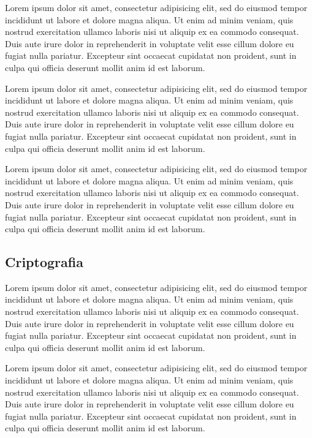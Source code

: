 \documentclass[
	12pt,				%
	twoside,			%
	a4paper,			%
	chapter=TITLE,		%
	english,			%
	brazil				%
	]{tcc}
\begin{document}
	Lorem ipsum dolor sit amet, consectetur adipisicing elit, sed do eiusmod
	tempor incididunt ut labore et dolore magna aliqua. Ut enim ad minim veniam,
	quis nostrud exercitation ullamco laboris nisi ut aliquip ex ea commodo
	consequat. Duis aute irure dolor in reprehenderit in voluptate velit esse
	cillum dolore eu fugiat nulla pariatur. Excepteur sint occaecat cupidatat non
	proident, sunt in culpa qui officia deserunt mollit anim id est laborum.

	Lorem ipsum dolor sit amet, consectetur adipisicing elit, sed do eiusmod
	tempor incididunt ut labore et dolore magna aliqua. Ut enim ad minim veniam,
	quis nostrud exercitation ullamco laboris nisi ut aliquip ex ea commodo
	consequat. Duis aute irure dolor in reprehenderit in voluptate velit esse
	cillum dolore eu fugiat nulla pariatur. Excepteur sint occaecat cupidatat non
	proident, sunt in culpa qui officia deserunt mollit anim id est laborum.

	Lorem ipsum dolor sit amet, consectetur adipisicing elit, sed do eiusmod
	tempor incididunt ut labore et dolore magna aliqua. Ut enim ad minim veniam,
	quis nostrud exercitation ullamco laboris nisi ut aliquip ex ea commodo
	consequat. Duis aute irure dolor in reprehenderit in voluptate velit esse
	cillum dolore eu fugiat nulla pariatur. Excepteur sint occaecat cupidatat non
	proident, sunt in culpa qui officia deserunt mollit anim id est laborum.

	\subsection{Criptografia}

	Lorem ipsum dolor sit amet, consectetur adipisicing elit, sed do eiusmod
	tempor incididunt ut labore et dolore magna aliqua. Ut enim ad minim veniam,
	quis nostrud exercitation ullamco laboris nisi ut aliquip ex ea commodo
	consequat. Duis aute irure dolor in reprehenderit in voluptate velit esse
	cillum dolore eu fugiat nulla pariatur. Excepteur sint occaecat cupidatat non
	proident, sunt in culpa qui officia deserunt mollit anim id est laborum.

	Lorem ipsum dolor sit amet, consectetur adipisicing elit, sed do eiusmod
	tempor incididunt ut labore et dolore magna aliqua. Ut enim ad minim veniam,
	quis nostrud exercitation ullamco laboris nisi ut aliquip ex ea commodo
	consequat. Duis aute irure dolor in reprehenderit in voluptate velit esse
	cillum dolore eu fugiat nulla pariatur. Excepteur sint occaecat cupidatat non
	proident, sunt in culpa qui officia deserunt mollit anim id est laborum.
\end{document}
